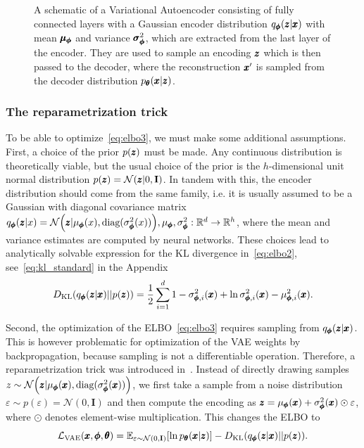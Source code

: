 \begin{figure}
\centering{}
\caption{A schematic of a Variational Autoencoder consisting of fully connected layers with a Gaussian encoder distribution $q_{\pmb{{\phi}}}(\pmb{{z}}|\pmb{{x}})$ with mean $\pmb{{\mu}}_{\pmb{{\phi}}}$ and variance $\pmb{{\sigma}}^2_{\pmb{{\phi}}}$, which are extracted from the last layer of the encoder. They are used to sample an encoding $\pmb{{z}}$ which is then passed to the decoder, where the reconstruction $\pmb{{x}}'$ is sampled from the decoder distribution $p_{\pmb{{\theta}}}(\pmb{{x}}|\pmb{{z}})$.}
\label{fig:vae}
\end{figure}

\subsubsection{The reparametrization trick}
To be able to optimize~\eqref{eq:elbo3}, we must make some additional assumptions. First, a choice of the prior $p(\pmb{{z}})$ must be made. Any continuous distribution is theoretically viable, but the usual choice of the prior is the $h$-dimensional unit normal distribution $p(\pmb{{z}})=\mathcal{N}(\pmb{{z}}|0,\textbf{I})$. In tandem with this, the encoder distribution should come from the same family, i.e. it is usually assumed to be a Gaussian with diagonal covariance matrix $q_{\vc{\phi}}(\vc{z}|x)=\mathcal{N}\left(\vc{z}|\mu_{\vc{\phi}}(x), \text{diag}(\sigma^2_{\vc{\phi}}(x))\right), \mu_{\vc{\phi}}, \sigma^2_{\vc{\phi}}:\mathbb{R}^d \rightarrow \mathbb{R}^h$, where the mean and variance estimates are computed by neural networks. These choices lead to analytically solvable expression for the KL divergence in~\eqref{eq:elbo2}, see~\eqref{eq:kl_standard} in the Appendix
\begin{equation}
D_{\text{KL}}\left(q_{\vc{\phi}}(\vc{z}|\vc{x})||p(\vc{z}) \right) = \frac{1}{2}\sum_{i=1}^{d} 1-\sigma_{\vc{\phi},i}^{2}(\vc{x})+\ln \sigma_{\vc{\phi},i}^{2}(\vc{x}) -\mu_{\vc{\phi},i}^{2}(\vc{x}).
\end{equation}


Second, the optimization of the ELBO~\eqref{eq:elbo3} requires sampling from $q_{\pmb{{\phi}}}(\pmb{{z}}|\pmb{{x}})$. This is however problematic for optimization of the VAE weights by backpropagation, because sampling is not a differentiable operation. Therefore, a reparametrization trick was introduced in~\cite{kingma2013vae}. Instead of directly drawing samples $z\sim\mathcal{N}\left(\vc{z}|\mu_{\vc{\phi}}(\vc{x}),\text{diag}(\sigma^2_{\vc{\phi}}(\vc{x}))\right)$, we first take a sample from a noise distribution $\varepsilon\sim p(\varepsilon)=\mathcal{N}(0,\mathbf{I})$ and then compute the encoding as $\pmb{{z}}=\mu_{\pmb{{\phi}}}(\pmb{{x}})+\sigma^2_{\pmb{{\phi}}}(\pmb{{x}}) \odot \varepsilon$, where $\odot$ denotes element-wise multiplication. This changes the ELBO to
\begin{equation}
\mathcal{L}_{\text{VAE}}(\vc{x},\vc{\phi},\vc{\theta})=\mathbb{E}_{\varepsilon\sim\mathcal{N}(0,\textbf{I})}\left[\ln p_{\vc{\theta}}(\vc{x}| \vc{z} )\right]-D_{\text{KL}}\left(q_{\vc{\phi}}(\vc{z}|\vc{x})||p(\vc{z})\right).\label{eq:vae_loss}
\end{equation}

